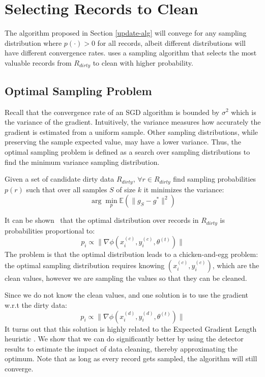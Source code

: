 \section{Selecting Records to Clean}\label{dist-samp}
The algorithm proposed in Section \ref{update-alg} will convege for 
any sampling distribution where  $p(\cdot) > 0$ for all records, albeit different distributions will have different convergence rates.
\sys uses a sampling algorithm that selects the most valuable records from $R_{dirty}$ to clean with higher probability. 

\subsection{Optimal Sampling Problem}
Recall that the convergence rate of an SGD algorithm is bounded by $\sigma^2$ which is the variance of the gradient.
Intuitively, the variance measures how accurately the gradient is estimated from a uniform sample.
Other sampling distributions, while preserving the sample expected value, may have a lower variance.
Thus, the optimal sampling problem is defined as a search over sampling distributions to find the minimum variance sampling distribution.

\begin{definition}
Given a set of candidate dirty data $R_{dirty}$, $\forall r \in R_{dirty}$ find sampling probabilities $p(r)$ such that over all samples $S$ of size $k$ it minimizes the variance:
\[
\arg\min_p \mathbb{E}(\|g_S - g^*\|^2)
\]
\end{definition}

It can be shown~\cite{zhao2014stochastic} that the optimal distribution over records in $R_{dirty}$ is probabilities proportional to:
\[
p_i \propto \|\nabla\phi(x^{(c)}_i,y^{(c)}_i,\theta^{(t)})\|
\]
The problem is that the optimal distribution leads to a chicken-and-egg problem:
the optimal sampling distribution requires knowing $(x^{(c)}_i,y^{(c)}_i)$, which are the clean values, however we are sampling the values so that they can be cleaned.

Since we do not know the clean values, and one solution is to use the gradient w.r.t the dirty data:
\[
p_i \propto \|\nabla\phi(x^{(d)}_i,y^{(d)}_i,\theta^{(t)})\|
\]
It turns out that this solution is highly related to the Expected Gradient Length heuristic \cite{settles2010active}.
We show that we can do significantly better by using the detector results to estimate the impact of data cleaning, thereby approximating the optimum.
Note that as long as every record gets sampled, the algorithm will still converge.




